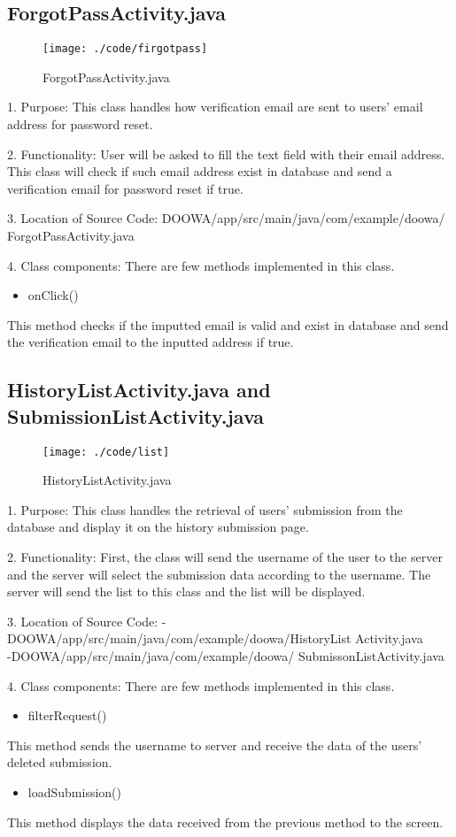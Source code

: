 \documentclass[conference]{IEEEtran}
\begin{document}
\subsection{ForgotPassActivity.java}
\begin{figure}[h!]
\texttt{[image: ./code/firgotpass]}
\centering
\caption{ForgotPassActivity.java}
\end{figure}
1. Purpose: This class handles how verification email are sent to users' email address for password reset.\break
\par 2. Functionality: User will be asked to fill the text field with their email address. This class will check if such email address exist in database and send a verification email for password reset if true.\break

3. Location of Source Code: DOOWA/app/src/main/java/com/example/doowa/ ForgotPassActivity.java\break

4. Class components: There are few methods implemented in this class.
\begin{itemize}
\item onClick()
\end{itemize}
This method checks if the imputted email is valid and exist in database and send the verification email to the inputted address if true.
\break
\subsection{HistoryListActivity.java and SubmissionListActivity.java}
\begin{figure}[h!]
\texttt{[image: ./code/list]}
\centering
\caption{HistoryListActivity.java}
\end{figure}
1. Purpose: This class handles the retrieval of users' submission from the database and display it on the history submission page.\break
\par 2. Functionality: First, the class will send the username of the user to the server and the server will select the submission data according to the username. The server will send the list to this class and the list will be displayed.\break

3. Location of Source Code: -DOOWA/app/src/main/java/com/example/doowa/HistoryList Activity.java\\
-DOOWA/app/src/main/java/com/example/doowa/ SubmissonListActivity.java
\break

4. Class components: There are few methods implemented in this class.
\begin{itemize}
\item filterRequest()
\end{itemize}
This method sends the username to server and receive the data of the users' deleted submission.
\begin{itemize}
\item loadSubmission()
\end{itemize}
This method displays the data received from the previous method to the screen.
\break
\end{document}
